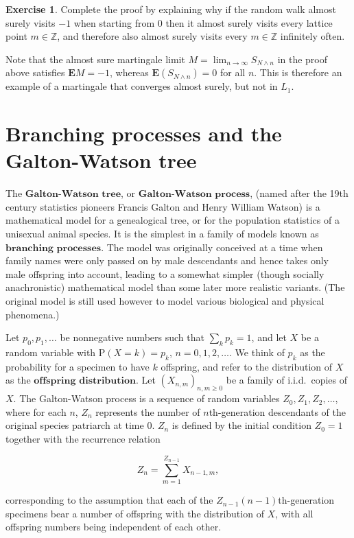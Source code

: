 \documentclass[11pt]{report}
\newcommand{\Z}{\mathbb{Z}}
\theoremstyle{plain}
\theoremstyle{definition}
\newtheorem{xexercise}[thm]{Exercise}
\begin{document}
\begin{xexercise}
Complete the proof by explaining why if the random
walk almost surely visits $-1$ when starting from $0$
then it almost surely visits every lattice point
$m\in\Z$, and therefore also almost surely visits
every $m\in\Z$ infinitely often.
\end{xexercise}

\noindent Note that the almost sure martingale limit
$M=\lim_{n\to\infty} S_{N\wedge n}$ in the proof
above satisfies $\mathbf{E} M=-1$, whereas
$\mathbf{E}(S_{N \wedge n})=0$ for all $n$. This is
therefore an example of a martingale that converges
almost surely, but not in $L_1$.

\section{Branching processes and the Galton-Watson tree}

The $\textbf{Galton-Watson tree}$, or
$\textbf{Galton-Watson process}$, (named after the
19th century statistics pioneers Francis Galton and
Henry William Watson) is a mathematical model for a
genealogical tree, or for the population statistics of
a unisexual animal species. It is the simplest in a
family of models known as
$\textbf{branching processes}$. The model was
originally conceived at a time when family names were
only passed on by male descendants and hence takes
only male offspring into account, leading to a
somewhat simpler (though socially anachronistic)
mathematical model than some later more realistic
variants.  (The original model is still used however
to model various biological and physical phenomena.)

Let $p_0, p_1, \ldots$ be nonnegative numbers such
that $\sum_k p_k = 1$, and let $X$ be a random
variable with $\mathrm{P}(X=k)=p_k$, $n=0,1,2,\ldots$.
We think of $p_k$ as the probability for a specimen
to have $k$ offspring, and refer to the distribution
of $X$ as the $\textbf{offspring distribution}$. Let
$(X_{n,m})_{n,m\ge 0}$ be a family of i.i.d.\ copies
of $X$. The Galton-Watson process is a sequence of
random variables $Z_0, Z_1, Z_2, \ldots$, where for
each $n$, $Z_n$ represents the number of
$n$th-generation descendants of the original species
patriarch at time $0$. $Z_n$ is defined by the
initial condition $Z_0=1$ together with the
recurrence relation

\[
Z_n = \sum_{m=1}^{Z_{n-1}} X_{n-1,m},
\]

\noindent corresponding to the assumption that each of the
$Z_{n-1}$$(n-1)$th-generation specimens bear a
number of offspring with the distribution of $X$,
with all offspring numbers being independent of each
other.
\end{document}
